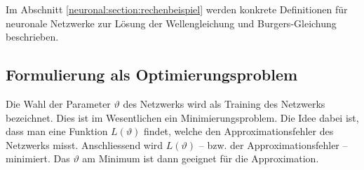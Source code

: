 Im Abschnitt \ref{neuronal:section:rechenbeispiel} werden konkrete Definitionen für neuronale Netzwerke zur Lösung der Wellengleichung und Burgers-Gleichung beschrieben.


\subsection{Formulierung als Optimierungsproblem}\label{neuronal:subsection:optimierungsproblem}
Die Wahl der Parameter $\vartheta$ des Netzwerks wird als Training des Netzwerks bezeichnet.
Dies ist im Wesentlichen ein Minimierungsproblem.
Die Idee dabei ist, dass man eine Funktion \( L(\vartheta) \) findet, welche den Approximationsfehler des Netzwerks misst.
Anschliessend wird $L(\vartheta)$ -- bzw. der Approximationsfehler -- minimiert.
Das $\vartheta$ am Minimum ist dann geeignet für die Approximation.

